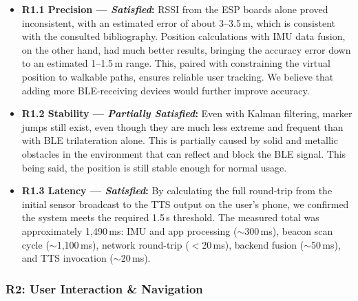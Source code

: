 \documentclass[12pt,a4paper]{article}
\begin{document}
\begin{itemize}
    \item \textbf{R1.1 Precision --- \textit{Satisfied}:}
    RSSI from the ESP boards alone proved inconsistent, with an estimated error of about 3--3.5\,m, which is consistent with the consulted bibliography. Position calculations with IMU data fusion, on the other hand, had much better results, bringing the accuracy error down to an estimated 1--1.5\,m range. This, paired with constraining the virtual position to walkable paths, ensures reliable user tracking. We believe that adding more BLE-receiving devices would further improve accuracy.

    \item \textbf{R1.2 Stability --- \textit{Partially Satisfied}:}
    Even with Kalman filtering, marker jumps still exist, even though they are much less extreme and frequent than with BLE trilateration alone. This is partially caused by solid and metallic obstacles in the environment that can reflect and block the BLE signal. This being said, the position is still stable enough for normal usage.

    \item \textbf{R1.3 Latency --- \textit{Satisfied}:}
    By calculating the full round-trip from the initial sensor broadcast to the TTS output on the user's phone, we confirmed the system meets the required 1.5\,s threshold. The measured total was approximately 1,490\,ms: IMU and app processing ($\sim$300\,ms), beacon scan cycle ($\sim$1,100\,ms), network round-trip ($<$20\,ms), backend fusion ($\sim$50\,ms), and TTS invocation ($\sim$20\,ms).
\end{itemize}

\subsubsection*{R2: User Interaction \& Navigation}
\end{document}
